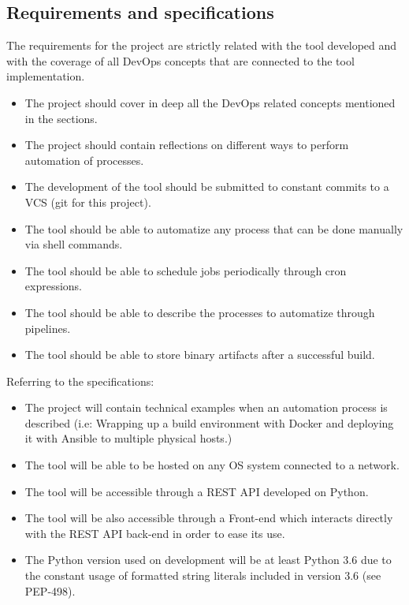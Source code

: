\documentclass{article}
\begin{document}
\subsection{Requirements and specifications}

The requirements for the project are strictly related with the tool developed and with the coverage of all DevOps concepts that are connected to the tool implementation. 

\begin{itemize}
	\item The project should cover in deep all the DevOps related concepts mentioned in the sections.
	\item The project should contain reflections on different ways to perform automation of processes.
	\item The development of the tool should be submitted to constant commits to a VCS (git for this project).
	\item The tool should be able to automatize any process that can be done manually via shell commands.
	\item The tool should be able to schedule jobs periodically through cron expressions.
	\item The tool should be able to describe the processes to automatize through pipelines.
	\item The tool should be able to store binary artifacts after a successful build.
\end{itemize}

Referring to the specifications:
\begin{itemize}
	\item The project will contain technical examples when an automation process is described (i.e: Wrapping up a build environment with Docker and deploying it with Ansible to multiple physical hosts.)
	\item The tool will be able to be hosted on any OS system connected to a network.
	\item The tool will be accessible through a REST \gls{API} developed on Python.
	\item The tool will be also accessible through a Front-end which interacts directly with the REST API back-end in order to ease its use.
	\item The Python version used on development will be at least Python 3.6 due to the constant usage of formatted string literals included in version 3.6 (see PEP-498).
\end{itemize}
\end{document}
